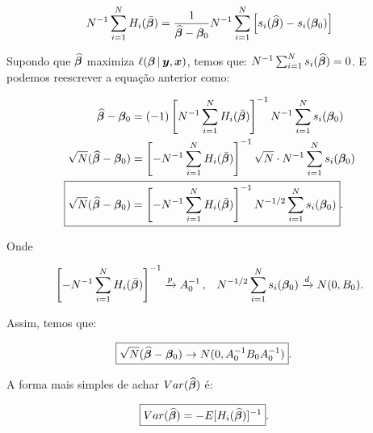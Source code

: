 \documentclass[11pt,oneside,a4paper]{article}
\numberwithin{equation}{section}
\begin{document}
\begin{description}
\begin{description}
\vspace{-1 em}
\begin{align*}
N^{-1} \sum_{i=1}^{N} 
H_{i} ( \bar{\boldsymbol{\beta}} ) 
=
\frac{1}{\widehat{\boldsymbol{\beta}} - \boldsymbol{\beta}_{0}}
N^{-1} \sum_{i=1}^{N} 
\left[ 
s_{i}( \widehat{\boldsymbol{\beta}} ) - s_{i}( \boldsymbol{\beta}_{0} )
\right]
\end{align*}

Supondo que
$\widehat{\boldsymbol{\beta}}$
maximiza
$\ell (\boldsymbol{\beta} \, | \, \boldsymbol{y}, \boldsymbol{x})$,
temos que:
$N^{-1} \sum_{i=1}^{N} s_{i}(\widehat{\boldsymbol{\beta}}) = 0$.
E podemos reescrever a equação anterior como:

\vspace{-1 em}
\begin{align*}
\widehat{\mbs{\beta}} - \mbs{\beta}_{0}
&=
(-1)
\left[ N^{-1} \sum_{i=1}^{N} H_{i} ( \bar{\mbs{\beta}} ) \right]^{-1}
N^{-1} \sum_{i=1}^{N} s_{i}( \mbs{\beta}_{0} ) 
\\
\sqrt{N} ( \widehat{\mbs{\beta}} - \mbs{\beta}_{0} )
&=
\left[
- N^{-1} \sum_{i=1}^{N} H_{i} ( \bar{\mbs{\beta}} )
\right]^{-1}
\sqrt{N} \cdot N^{-1} \sum_{i=1}^{N} s_{i}( \mbs{\beta}_{0} ) 
\\
\Aboxed{
\sqrt{N} ( \widehat{\mbs{\beta}} - \mbs{\beta}_{0} )
&=
\left[
- N^{-1} \sum_{i=1}^{N} H_{i} ( \bar{\mbs{\beta}} )
\right]^{-1}
N^{-1/2} \sum_{i=1}^{N} s_{i}( \mbs{\beta}_{0} ) }.
\end{align*}

\noindent
Onde

\vspace{-1 em}
\begin{align*}
\left[ 
- N^{-1} \sum_{i=1}^{N}
H_{i} ( \bar{\boldsymbol{\beta}} ) \right]^{-1}
\xrightarrow{p}
A_{0}^{-1} \, ,
&&
N^{-1/2} \sum_{i=1}^{N} s_{i}( \boldsymbol{\beta}_{0} ) 
\xrightarrow{d}
N( 0, B_{0} ).
\end{align*}

\noindent
Assim, temos que:

\vspace{-1 em}
\begin{align*}
\Aboxed{
\sqrt{N} ( \widehat{\mbs{\beta}} - \mbs{\beta}_{0} )
\to
N ( 0, A_{0}^{-1} B_{0} A_{0}^{-1} )}.
\end{align*}

A forma mais simples de achar $Var ( {\widehat{\boldsymbol{\beta}}} )$ é:

\vspace{-1 em}
\begin{align*}
	\Aboxed{
Var( \widehat{\mbs{\beta}} )
&=
- E[ H_{i} ( \widehat{\mbs{\beta}} ) ]^{-1} }.
\end{align*}


\end{description}
\end{description}
\end{document}
